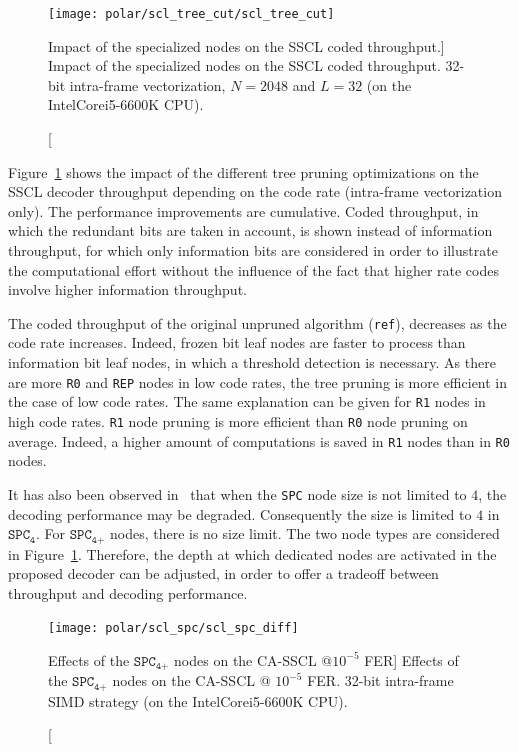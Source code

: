 \begin{figure}[htp]
  \centering
  \texttt{[image: polar/scl\_tree\_cut/scl\_tree\_cut]}
  \caption
    [Impact of the specialized nodes on the SSCL coded throughput.]
    {Impact of the specialized nodes on the SSCL coded throughput.
    32-bit intra-frame vectorization, $N=2048$ and $L=32$
    (on the Intel\R Core\TM i5-6600K CPU).}
  \label{plot:polar_scl_tree_cut}
\end{figure}

Figure~\ref{plot:polar_scl_tree_cut} shows the impact of the different tree
pruning optimizations on the SSCL decoder throughput depending on the code
rate (intra-frame vectorization only). The performance improvements are
cumulative. Coded throughput, in which the redundant bits are taken in account,
is shown instead of information throughput, for which only information bits are
considered in order to illustrate the computational effort without the influence
of the fact that higher rate codes involve higher information throughput.

The coded throughput of the original unpruned algorithm (\verb|ref|), decreases
as the code rate increases. Indeed, frozen bit leaf nodes are faster to process
than information bit leaf nodes, in which a threshold detection is necessary. As
there are more \verb|R0| and \verb|REP| nodes in low code rates, the tree
pruning is more efficient in the case of low code rates. The same explanation
can be given for \verb|R1| nodes in high code rates. \verb|R1| node pruning is
more efficient than \verb|R0| node pruning on average. Indeed, a higher amount
of computations is saved in \verb|R1| nodes than in \verb|R0| nodes.

It has also been observed in~\cite{Sarkis2016} that when the \verb|SPC| node
size is not limited to $4$, the decoding performance may be degraded.
Consequently the size is limited to $4$ in $\texttt{SPC}_\texttt{4}$. For
$\texttt{SPC}_\texttt{4+}$ nodes, there is no size limit. The two node types are
considered in Figure~\ref{plot:polar_scl_tree_cut}. Therefore, the depth at
which dedicated nodes are activated in the proposed decoder can be adjusted, in
order to offer a tradeoff between throughput and decoding performance.

\begin{figure}[htp]
  \centering
  \texttt{[image: polar/scl\_spc/scl\_spc\_diff]}
  \caption
    [Effects of the $\texttt{SPC}_\texttt{4+}$ nodes on the CA-SSCL @$10^{-5}$
     FER]
    {Effects of the $\texttt{SPC}_\texttt{4+}$ nodes on the CA-SSCL @ $10^{-5}$
     FER. 32-bit intra-frame SIMD strategy (on the Intel\R Core\TM i5-6600K
     CPU).}
  \label{plot:polar_scl_spc}
\end{figure}

